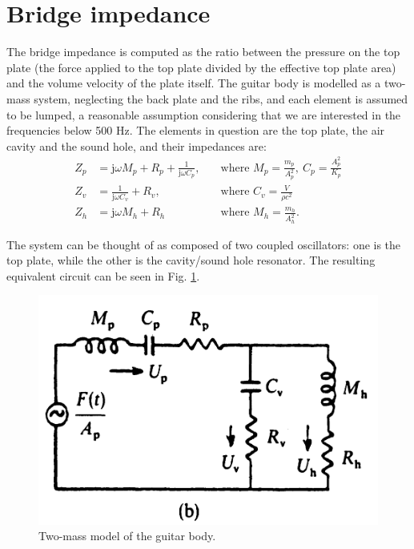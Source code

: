 \documentclass[a4paper]{article}
\begin{document}
\section{Bridge impedance}
The bridge impedance is computed as the ratio between the pressure on the top plate (the force applied to the top plate divided by the effective top plate area) and the volume velocity of the plate itself. The guitar body is modelled as a two-mass system, neglecting the back plate and the ribs, and each element is assumed to be lumped, a reasonable assumption considering that we are interested in the frequencies below 500 Hz. The elements in question are the top plate, the air cavity and the sound hole, and their impedances are:
\begin{align*}
	Z_p &= \mathrm{j}\omega M_p + R_p + \frac{1}{\mathrm{j}\omega C_p}, \quad &\text{where } M_p = \frac{m_p}{A_p^2}, ~ C_p = \frac{A_p^2}{K_p} \\
	Z_v &= \frac{1}{\mathrm{j}\omega C_v} + R_v, \quad &\text{where } C_v = \frac{V}{\rho c^2} \\
	Z_h &= \mathrm{j}\omega M_h + R_h \quad &\text{where } M_h = \frac{m_h}{A_h^2}.
\end{align*}

The system can be thought of as composed of two coupled oscillators: one is the top plate, while the other is the  cavity/sound hole resonator. The resulting equivalent circuit can be seen in Fig. \ref{fig:2mass}.


\begin{figure}
	\centering
	\includegraphics[width=\linewidth]{2mass.png}
	\caption{Two-mass model of the guitar body.}
	\label{fig:2mass}
\end{figure}
\end{document}
